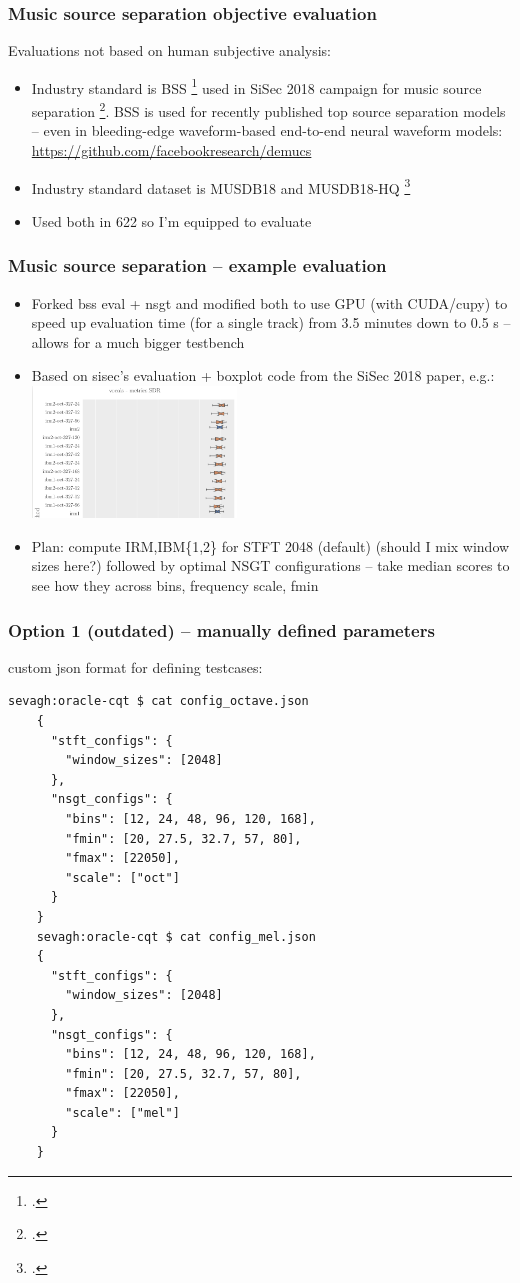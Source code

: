 \documentclass[usenames,dvipsnames]{beamer}
\begin{document}
\begin{frame}
	\frametitle{Music source separation objective evaluation}
	Evaluations not based on human subjective analysis:
	\begin{itemize}
		\item
			Industry standard is BSS \footcite{bss} used in SiSec 2018 campaign for music source separation \footcite{sigsep2018}. BSS is used for recently published top source separation models -- even in bleeding-edge waveform-based end-to-end neural waveform models: \href{https://github.com/facebookresearch/demucs}{https://github.com/facebookresearch/demucs}
		\item
			Industry standard dataset is MUSDB18 and MUSDB18-HQ \footcite{musdb18, musdb18-hq}
		\item
			Used both in 622 so I'm equipped to evaluate
	\end{itemize}
\end{frame}

\begin{frame}
	\frametitle{Music source separation -- example evaluation}
	\begin{itemize}
		\item
			Forked bss eval + nsgt and modified both to use GPU (with CUDA/cupy) to speed up evaluation time (for a single track) from 3.5 minutes down to 0.5 s -- allows for a much bigger testbench
		\item
			Based on sisec's evaluation + boxplot code from the SiSec 2018 paper, e.g.:\\
			\includegraphics[height=3.5cm]{./irm_boxplot_example.png}
		\item
			Plan: compute IRM,IBM\{1,2\} for STFT 2048 (default) (should I mix window sizes here?) followed by optimal NSGT configurations -- take median scores to see how they across bins, frequency scale, fmin
	\end{itemize}
\end{frame}

\begin{frame}[fragile]
	\frametitle{Option 1 (outdated) -- manually defined parameters}
	custom json format for defining testcases:
	\begin{Verbatim}[fontsize=\tiny]
	sevagh:oracle-cqt $ cat config_octave.json
	{
	  "stft_configs": {
	    "window_sizes": [2048]
	  },
	  "nsgt_configs": {
	    "bins": [12, 24, 48, 96, 120, 168],
	    "fmin": [20, 27.5, 32.7, 57, 80],
	    "fmax": [22050],
	    "scale": ["oct"]
	  }
	}
	sevagh:oracle-cqt $ cat config_mel.json
	{
	  "stft_configs": {
	    "window_sizes": [2048]
	  },
	  "nsgt_configs": {
	    "bins": [12, 24, 48, 96, 120, 168],
	    "fmin": [20, 27.5, 32.7, 57, 80],
	    "fmax": [22050],
	    "scale": ["mel"]
	  }
	}
	\end{Verbatim}
\end{frame}
\end{document}
